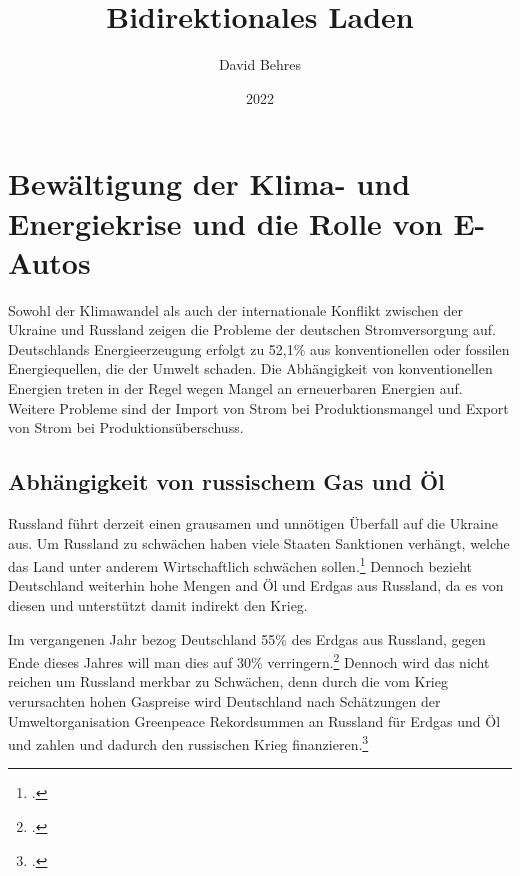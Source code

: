 \documentclass[12pt, ngerman]{article}
\begin{document}
    \begin{titlepage}


        \title{Bidirektionales Laden}
        \author{David Behres}
        \date{2022}
        \maketitle

    \end{titlepage}

    \tableofcontents
    \pagebreak


    \section{Bewältigung der Klima- und Energiekrise und die Rolle von E-Autos}



    Sowohl der Klimawandel als auch der internationale Konflikt zwischen der Ukraine und Russland zeigen die Probleme
    der deutschen Stromversorgung auf.
    Deutschlands Energieerzeugung erfolgt zu 52,1\% aus konventionellen oder fossilen Energiequellen, die der Umwelt
    schaden.
    Die Abhängigkeit von konventionellen Energien treten in der Regel wegen Mangel an erneuerbaren Energien auf.
    Weitere Probleme sind der Import von Strom bei Produktionsmangel und Export von Strom bei Produktionsüberschuss.

    \subsection{Abhängigkeit von russischem Gas und Öl} \label{subsec:putin}
    Russland führt derzeit einen grausamen und unnötigen Überfall auf die Ukraine aus.
    Um Russland zu schwächen haben viele Staaten Sanktionen verhängt, welche das Land unter anderem Wirtschaftlich
    schwächen sollen.\footcite{SanktionenGegenRussland2022}
    Dennoch bezieht Deutschland weiterhin hohe Mengen and Öl und Erdgas aus Russland, da es von diesen und
    unterstützt damit indirekt den Krieg.


    Im vergangenen Jahr bezog Deutschland 55\% des Erdgas aus Russland, gegen Ende dieses Jahres will man dies auf
    30\% verringern.\footcite{wdraktuellFAQWasGasLieferstopp} Dennoch wird das nicht reichen um Russland merkbar zu
    Schwächen, denn durch die vom Krieg verursachten hohen Gaspreise wird Deutschland nach Schätzungen der
    Umweltorganisation Greenpeace Rekordsummen an Russland für Erdgas und Öl und zahlen und dadurch den russischen
    Krieg finanzieren.\footcite{balserOlUndGas}
\end{document}
